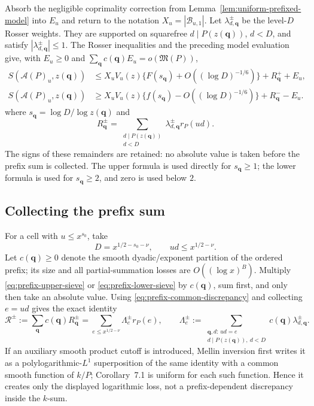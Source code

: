 \documentclass[10pt,reqno]{amsart}
\newcommand{\Acal}{\mathcal{A}}
\newcommand{\Bcal}{\mathcal{B}}
\newcommand{\1}{\mathbf{1}}
\theoremstyle{plain}
\theoremstyle{remark}
\begin{document}
Absorb the negligible coprimality correction from
Lemma~\ref{lem:uniform-prefixed-model} into $E_u$ and return to the notation
$X_u=|\Bcal_{u,1}|$.
Let \(\lambda_{d,\boldsymbol q}^{\pm}\) be the level-\(D\) Rosser weights.
They are supported on squarefree \(d\mid P(z(\boldsymbol q))\), \(d<D\),
and satisfy \(|\lambda_{d,\boldsymbol q}^{\pm}|\le1\).
The Rosser inequalities and the preceding model evaluation give, with
\(E_u\ge0\) and
\(\sum_{\boldsymbol q}c(\boldsymbol q)E_u=o(\mathfrak M(P))\),
\cite[Chapter 12, (12.12)--(12.14), pp. 235--236]{FriedlanderIwaniec2010}
\begin{align}
 S(\Acal(P)_u,z(\boldsymbol q))
 &\le X_uV_u(z)
 \{F(s_{\boldsymbol q})+O((\log D)^{-1/6})\}
 +R_{\boldsymbol q}^{+}+E_u,\label{eq:prefix-upper-sieve}\\
 S(\Acal(P)_u,z(\boldsymbol q))
 &\ge X_uV_u(z)
 \{f(s_{\boldsymbol q})-O((\log D)^{-1/6})\}
 +R_{\boldsymbol q}^{-}-E_u.\label{eq:prefix-lower-sieve}
\end{align}
where \(s_{\boldsymbol q}=\log D/\log z(\boldsymbol q)\) and
\[
 R_{\boldsymbol q}^{\pm}
 =\sum_{\substack{d\mid P(z(\boldsymbol q))\\d<D}}
 \lambda_{d,\boldsymbol q}^{\pm}r_P(ud).
\]
The signs of these remainders are retained: no absolute value is taken
before the prefix sum is collected.  The upper formula is used directly for
\(s_{\boldsymbol q}\ge1\); the lower formula is used for
\(s_{\boldsymbol q}\ge2\), and zero is used below \(2\).

\subsection{Collecting the prefix sum}

For a cell with \(u\le x^{s_0}\), take
\[
 D=x^{1/2-s_0-\nu},\qquad ud\le x^{1/2-\nu}.
\]
Let \(c(\boldsymbol q)\ge0\) denote the smooth dyadic/exponent partition of
the ordered prefix; its size and all partial-summation losses are
\(O((\log x)^B)\).  Multiply \eqref{eq:prefix-upper-sieve} or
\eqref{eq:prefix-lower-sieve} by \(c(\boldsymbol q)\), sum first, and only
then take an absolute value.  Using
\eqref{eq:prefix-common-discrepancy} and collecting \(e=ud\) gives the exact
identity
\begin{equation}\label{eq:collected-prefix-remainder}
 \mathcal R^{\pm}
 :=\sum_{\boldsymbol q}c(\boldsymbol q)R_{\boldsymbol q}^{\pm}
 =\sum_{e\le x^{1/2-\nu}}\Lambda_e^{\pm}r_P(e),\qquad
 \Lambda_e^{\pm}:=
 \sum_{\substack{\boldsymbol q,d:\,ud=e\\
                   d\mid P(z(\boldsymbol q)),\ d<D}}
 c(\boldsymbol q)\lambda_{d,\boldsymbol q}^{\pm}.
\end{equation}
If an auxiliary smooth product cutoff is introduced, Mellin inversion first
writes it as a polylogarithmic-\(L^1\) superposition of the same identity
with a common smooth function of \(k/P\); Corollary~7.1 is uniform for each
such function.  Hence it creates only the displayed logarithmic loss, not a
prefix-dependent discrepancy inside the \(k\)-sum.
\end{document}
